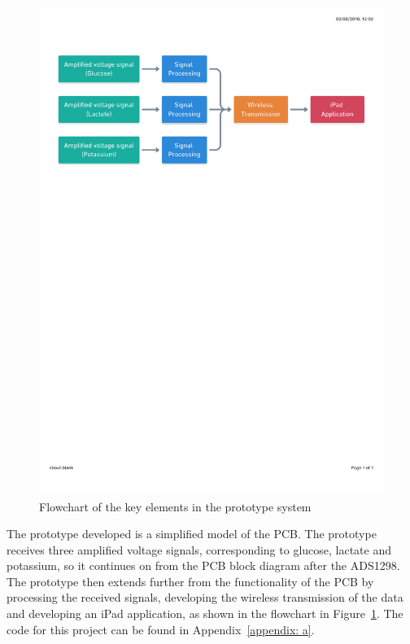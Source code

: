 \begin{figure}[t!]
\centering
\includegraphics[trim={0cm 19.5cm 0.5cm  2.5cm}, clip, width=1\textwidth]{./figures/Flowchart.pdf}
\captionsetup{justification=centering}
\caption{Flowchart of the key elements in the prototype system}
\label{fig: flowchart}
\end{figure}

The prototype developed is a simplified model of the PCB. The prototype receives three amplified voltage signals, corresponding to glucose, lactate and potassium, so it continues on from the PCB block diagram after the ADS1298. The prototype then extends further from the functionality of the PCB by processing the received signals, developing the wireless transmission of the data and developing an iPad application, as shown in the flowchart in Figure~\ref{fig: flowchart}. The code for this project can be found in Appendix~\ref{appendix: a}.



